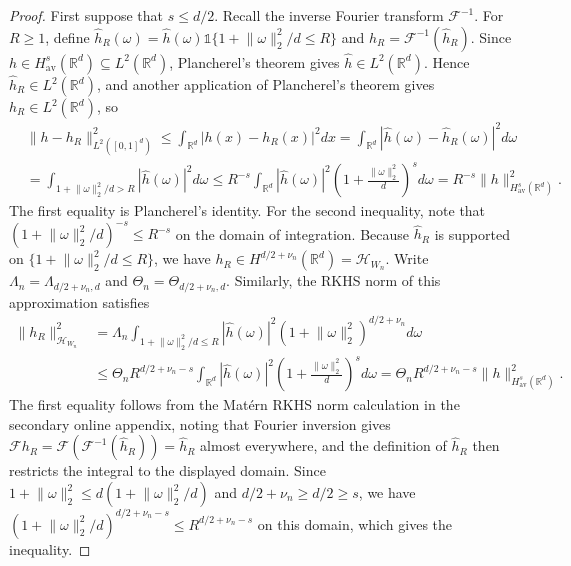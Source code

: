 \documentclass[letterpaper,12pt]{article}
\theoremstyle{definition}
\numberwithin{equation}{section}
\newcommand{\mc}{\mathcal}
\newcommand{\one}{\mathds{1}}
\newcommand{\norm}[1]{\lVert#1\rVert}
\begin{document}
\begin{proof}
First suppose that $s\leq d/2$.
Recall the inverse Fourier transform $\mathcal F^{-1}$.
For $R\geq1$, define $\widehat h_R(\omega)=\widehat h(\omega)\one\{1+\norm{\omega}_2^2/d\leq R\}$ and $h_R=\mathcal F^{-1}(\widehat h_R)$.
Since $h\in H_{\mathrm{av}}^s(\mathbb R^d)\subseteq L^2(\mathbb R^d)$, Plancherel's theorem gives $\widehat h\in L^2(\mathbb R^d)$.
Hence $\widehat h_R\in L^2(\mathbb R^d)$, and another application of Plancherel's theorem gives $h_R\in L^2(\mathbb R^d)$, so
\begin{align*}
&\norm{h-h_R}_{L^2([0,1]^d)}^2\leq\int_{\mathbb R^d}|h(x)-h_R(x)|^2dx=\int_{\mathbb R^d}|\widehat h(\omega)-\widehat h_R(\omega)|^2d\omega\\
&=\int_{1+\norm{\omega}_2^2/d>R}|\widehat h(\omega)|^2d\omega\leq R^{-s}\int_{\mathbb R^d}|\widehat h(\omega)|^2\left(1+\frac{\norm{\omega}_2^2}{d}\right)^sd\omega =R^{-s}\norm{h}_{H_{\mathrm{av}}^s(\mathbb R^d)}^2.
\end{align*}
The first equality is Plancherel's identity.
For the second inequality, note that $(1+\norm{\omega}_2^2/d)^{-s}\leq R^{-s}$ on the domain of integration.
Because $\widehat h_R$ is supported on $\{1+\norm{\omega}_2^2/d\leq R\}$, we have $h_R\in H^{d/2+\nu_n}(\mathbb R^d)=\mc H_{W_n}$.
Write $\Lambda_n=\Lambda_{d/2+\nu_n,d}$ and $\Theta_n=\Theta_{d/2+\nu_n,d}$.
Similarly, the RKHS norm of this approximation satisfies
\begin{align*}
\norm{h_R}_{\mc H_{W_n}}^2&=\Lambda_n\int_{1+\norm{\omega}_2^2/d\leq R}|\widehat h(\omega)|^2(1+\norm{\omega}_2^2)^{d/2+\nu_n}d\omega\\
&\leq\Theta_nR^{d/2+\nu_n-s}\int_{\mathbb R^d}|\widehat h(\omega)|^2\left(1+\frac{\norm{\omega}_2^2}{d}\right)^sd\omega=\Theta_nR^{d/2+\nu_n-s}\norm{h}_{H_{\mathrm{av}}^s(\mathbb R^d)}^2.
\end{align*}
The first equality follows from the Mat\'ern RKHS norm calculation in the secondary online appendix, noting that Fourier inversion gives $\mathcal Fh_R=\mathcal F(\mathcal F^{-1}(\widehat h_R))=\widehat h_R$ almost everywhere, and the definition of $\widehat h_R$ then restricts the integral to the displayed domain.
Since $1+\norm{\omega}_2^2\leq d(1+\norm{\omega}_2^2/d)$ and $d/2+\nu_n\geq d/2\geq s$, we have $(1+\norm{\omega}_2^2/d)^{d/2+\nu_n-s}\leq R^{d/2+\nu_n-s}$ on this domain, which gives the inequality.


\end{proof}
\end{document}
